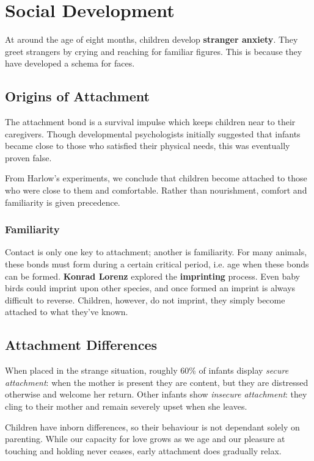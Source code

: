 \documentclass[12pt]{article}
\begin{document}
\section*{Social Development}
At around the age of eight months, children develop {\bf stranger anxiety}. They greet strangers by crying and reaching for familiar figures. This is because they have developed a schema for faces.

\subsection*{Origins of Attachment}
The attachment bond is a survival impulse which keeps children near to their caregivers. Though developmental psychologists initially suggested that infants became close to those who satisfied their physical needs, this was eventually proven false.

From Harlow's experiments, we conclude that children become attached to those who were close to them and comfortable. Rather than nourishment, comfort and familiarity is given precedence.

\subsubsection*{Familiarity}
Contact is only one key to attachment; another is familiarity. For many animals, these bonds must form during a certain critical period, i.e. age when these bonds can be formed. {\bf Konrad Lorenz} explored the {\bf imprinting} process. Even baby birds could imprint upon other species, and once formed an imprint is always difficult to reverse. Children, however, do not imprint, they simply become attached to what they've known.

\subsection*{Attachment Differences}
When placed in the strange situation, roughly 60\% of infants display {\it secure attachment}: when the mother is present they are content, but they are distressed otherwise and welcome her return. Other infants show {\it insecure attachment}: they cling to their mother and remain severely upset when she leaves.

Children have inborn differences, so their behaviour is not dependant solely on parenting. While our capacity for love grows as we age and our pleasure at touching and holding never ceases, early attachment does gradually relax.
\end{document}

